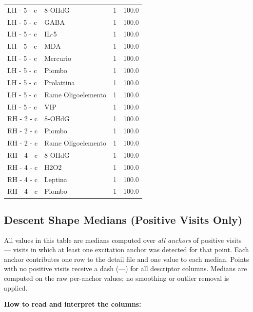 \documentclass[a4paper,11pt]{article}
\begin{document}
\begin{footnotesize}
\begin{longtable}{p{3.5cm}p{7.5cm}rr}
LH - 5 - c & 8-OHdG & 1 & 100.0 \\
LH - 5 - c & GABA & 1 & 100.0 \\
LH - 5 - c & IL-5 & 1 & 100.0 \\
LH - 5 - c & MDA & 1 & 100.0 \\
LH - 5 - c & Mercurio & 1 & 100.0 \\
LH - 5 - c & Piombo & 1 & 100.0 \\
LH - 5 - c & Prolattina & 1 & 100.0 \\
LH - 5 - c & Rame Oligoelemento & 1 & 100.0 \\
LH - 5 - c & VIP & 1 & 100.0 \\
RH - 2 - c & 8-OHdG & 1 & 100.0 \\
RH - 2 - c & Piombo & 1 & 100.0 \\
RH - 2 - c & Rame Oligoelemento & 1 & 100.0 \\
RH - 4 - c & 8-OHdG & 1 & 100.0 \\
RH - 4 - c & H2O2 & 1 & 100.0 \\
RH - 4 - c & Leptina & 1 & 100.0 \\
RH - 4 - c & Piombo & 1 & 100.0 \\
\end{longtable}
\end{footnotesize}

\subsection{Descent Shape Medians (Positive Visits Only)}

All values in this table are medians computed over \emph{all anchors} of positive visits ---
visits in which at least one excitation anchor was detected for that point. Each anchor
contributes one row to the detail file and one value to each median. Points with no positive
visits receive a dash (---) for all descriptor columns.
Medians are computed on the raw per-anchor values; no smoothing or outlier removal is
applied.

\medskip
\noindent\textbf{How to read and interpret the columns:}
\end{document}
